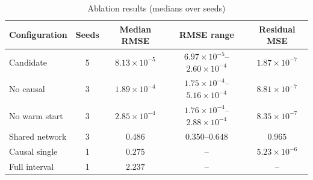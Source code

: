 \begin{table}[t]
\caption{Ablation results (medians over seeds)}
\label{tab:ablations}
\centering\footnotesize
\begin{tabular}{lcccc}
\toprule
Configuration & Seeds & Median RMSE & RMSE range & Residual MSE\\
\midrule
Candidate & 5 & $8.13\!\times\!10^{-5}$ & $6.97\!\times\!10^{-5}$--$2.60\!\times\!10^{-4}$ & $1.87\!\times\!10^{-7}$\\
No causal & 3 & $1.89\!\times\!10^{-4}$ & $1.75\!\times\!10^{-4}$--$5.16\!\times\!10^{-4}$ & $8.81\!\times\!10^{-7}$\\
No warm start & 3 & $2.85\!\times\!10^{-4}$ & $1.76\!\times\!10^{-4}$--$2.88\!\times\!10^{-4}$ & $8.35\!\times\!10^{-7}$\\
Shared network & 3 & $0.486$ & $0.350$--$0.648$ & $0.965$\\
Causal single & 1 & $0.275$ & -- & $5.23\!\times\!10^{-6}$\\
Full interval & 1 & $2.237$ & -- & --\\
\bottomrule
\end{tabular}
\end{table}
